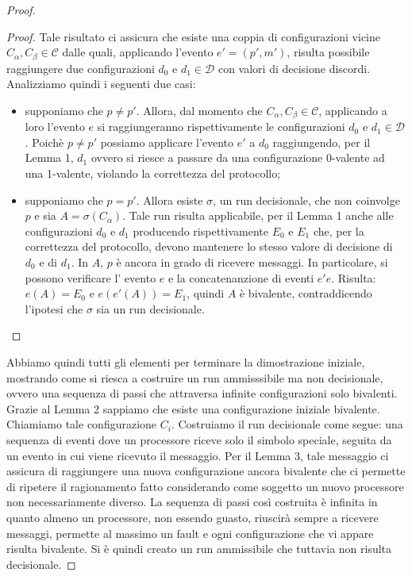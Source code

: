\documentclass{article}
\begin{document}
\begin{proof}
\begin{proof}
Tale risultato ci assicura che esiste una coppia di configurazioni vicine $C_{\alpha}, C_{\beta} \in \mathcal{C}$ dalle quali, applicando l'evento $e'=(p',m')$, risulta possibile raggiungere due configurazioni $d_0$ e $d_1 \in \mathcal{D}$ con valori di decisione discordi. Analizziamo quindi i seguenti due casi:
\begin{itemize}
\item supponiamo che $p \neq p'$. Allora, dal momento che $C_{\alpha}, C_{\beta} \in \mathcal{C}$, applicando a loro l'evento $e$ si raggiungeranno rispettivamente le configurazioni $d_0$ e $d_1 \in \mathcal{D}$. Poichè $p\neq p'$ possiamo applicare l'evento $e'$ a $d_0$ raggiungendo, per il Lemma 1, $d_1$ ovvero si riesce a passare da una configurazione 0-valente ad una 1-valente, violando la correttezza del protocollo;
\item supponiamo che $p=p'$. Allora esiste $\sigma$, un run decisionale, che non coinvolge $p$ e sia $A=\sigma(C_{\alpha})$. Tale run risulta applicabile, per il Lemma 1 anche alle configurazioni $d_0$ e $d_1$ producendo rispettivamente $E_0$ e $E_1$ che, per la correttezza del protocollo, devono mantenere lo stesso valore di decisione di $d_0$ e di $d_1$. In $A$, $p$ è ancora in grado di ricevere messaggi. In particolare, si possono verificare l' evento $e$ e la concatenanzione di eventi $e'e$. Risulta: $e(A)=E_0$ e $e(e'(A))=E_1$, quindi $A$ è bivalente, contraddicendo l'ipotesi che $\sigma$ sia un run decisionale.        
\end{itemize} 
\end{proof}
Abbiamo quindi tutti gli elementi per terminare la dimostrazione iniziale, mostrando come si riesca a costruire un run ammisssibile ma non decisionale, ovvero una sequenza di passi che attraversa infinite configurazioni solo bivalenti. \\
Grazie al Lemma 2 sappiamo che esiste una configurazione iniziale bivalente. Chiamiamo tale configurazione $C_i$. Costruiamo il run decisionale come segue: una sequenza di eventi dove un processore riceve solo il simbolo speciale, seguita da un evento in cui viene ricevuto il messaggio.  Per il Lemma 3, tale messaggio ci assicura di raggiungere una nuova configurazione ancora bivalente che ci permette di ripetere il ragionamento fatto considerando come soggetto un nuovo processore non necessariamente diverso. La sequenza di passi così costruita è infinita in quanto almeno un processore, non essendo guasto, riuscirà sempre a ricevere messaggi, permette al massimo un fault e ogni configurazione che vi appare risulta bivalente. Si è quindi creato un run ammissibile che tuttavia non risulta decisionale.    
\end{proof}
\end{document}

